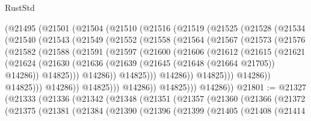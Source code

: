 \begin{lexlean}{RustStd}
\begin{coremodule}
    (@21495
      (@21501
        (@21504
          (@21510
            (@21516
              (@21519
                (@21525
                  (@21528
                    (@21534
                      (@21540
                        (@21543
                          (@21549
                            (@21552
                              (@21558
                                (@21564
                                  (@21567
                                    (@21573
                                      (@21576
                                        (@21582
                                          (@21588
                                            (@21591
                                              (@21597
                                                (@21600
                                                  (@21606
                                                    (@21612
                                                      (@21615
                                                        (@21621
                                                          (@21624
                                                            (@21630
                                                              (@21636
                                                                (@21639
                                                                  (@21645
                                                                    (@21648 (@21664 @21705))
                                                                    @14286))
                                                                @14825)))
                                                          @14286))
                                                      @14825)))
                                                @14286))
                                            @14825)))
                                      @14286))
                                  @14825)))
                            @14286))
                        @14825)))
                  @14286))
              @14825)))
        @14286))
@21801 := @21327
    (@21333
      (@21336
        (@21342
          (@21348
            (@21351
              (@21357
                (@21360
                  (@21366
                    (@21372
                      (@21375
                        (@21381
                          (@21384
                            (@21390
                              (@21396
                                (@21399
                                  (@21405
                                    (@21408
                                      (@21414

\end{coremodule}
\end{lexlean}
